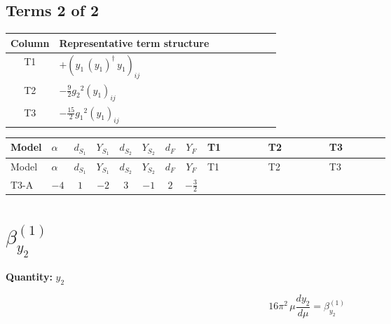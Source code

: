 \documentclass[8pt]{article}
\begin{document}
\begin{landscape}
\subsection*{Terms 2 of 2}
\begin{center}
\begin{tabular}{@{}c >{\raggedright\arraybackslash}p{0.82\linewidth}@{}}
\toprule
Column & Representative term structure \\
\midrule
T1 & \(\displaystyle +\left({y_1}\,\left({y_1}\right)^{\dagger}\,{y_1}\right)_{ij}\) \\
\midrule
T2 & \(\displaystyle -\frac{9}{2} {g_2}^2 \left({y_1}\right)_{ij}\) \\
\midrule
T3 & \(\displaystyle -\frac{15}{2} {g_1}^2 \left({y_1}\right)_{ij}\) \\
\midrule
\bottomrule
\end{tabular}
\end{center}
\smallskip
\tiny
\begin{longtable}{@{}llcccccc >{\raggedright\arraybackslash}p{0.21\linewidth} >{\raggedright\arraybackslash}p{0.21\linewidth} >{\raggedright\arraybackslash}p{0.21\linewidth}@{}}
\toprule
Model & $\alpha$ & $d_{S_1}$ & $Y_{S_1}$ & $d_{S_2}$ & $Y_{S_2}$ & $d_F$ & $Y_F$ & T1 & T2 & T3 \\
\midrule
\endfirsthead
\toprule
Model & $\alpha$ & $d_{S_1}$ & $Y_{S_1}$ & $d_{S_2}$ & $Y_{S_2}$ & $d_F$ & $Y_F$ & T1 & T2 & T3 \\
\midrule
\endhead
T3-A & $-4$ & $1$ & $-2$ & $3$ & $-1$ & $2$ & $-\frac{3}{2}$ & \scriptsize\adjustbox{max width=\linewidth}{$\begin{gathered} +\left({y_1}\,\left({y_1}\right)^{\dagger}\,{y_1}\right)_{ij}\end{gathered}$} & \scriptsize\adjustbox{max width=\linewidth}{$\begin{gathered} -\frac{9}{2} {g_2}^2 \left({y_1}\right)_{ij}\end{gathered}$} & \scriptsize\adjustbox{max width=\linewidth}{$\begin{gathered} -\frac{15}{2} {g_1}^2 \left({y_1}\right)_{ij}\end{gathered}$} \\
\midrule
\bottomrule
\end{longtable}
\clearpage
\section*{$\beta_{y_2}^{(1)}$}
\noindent\textbf{Quantity: }$y_2$\par\smallskip
\[16\pi^2\,\mu\frac{d y_2}{d\mu}=\beta_{y_2}^{(1)}\]

\end{landscape}
\end{document}
